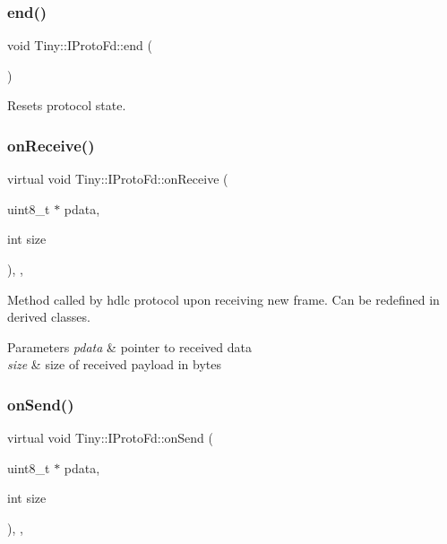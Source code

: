 \subsubsection{\texorpdfstring{end()}{end()}}
{\footnotesize\ttfamily void Tiny\+::\+I\+Proto\+Fd\+::end (\begin{DoxyParamCaption}{ }\end{DoxyParamCaption})}

Resets protocol state. \mbox{\label{classTiny_1_1IProtoFd_a795b41c969708964cd4646580af1c3ab}} 
\subsubsection{\texorpdfstring{on\+Receive()}{onReceive()}}
{\footnotesize\ttfamily virtual void Tiny\+::\+I\+Proto\+Fd\+::on\+Receive (\begin{DoxyParamCaption}\item[{uint8\+\_\+t $\ast$}]{pdata,  }\item[{int}]{size }\end{DoxyParamCaption})\hspace{0.3cm}{\ttfamily [inline]}, {\ttfamily [protected]}, {\ttfamily [virtual]}}

Method called by hdlc protocol upon receiving new frame. Can be redefined in derived classes. 
\begin{DoxyParams}{Parameters}
{\em pdata} & pointer to received data \\
\hline
{\em size} & size of received payload in bytes \\
\hline
\end{DoxyParams}
\mbox{\label{classTiny_1_1IProtoFd_acd324920c1f35d378fb5153b51cd6561}} 
\subsubsection{\texorpdfstring{on\+Send()}{onSend()}}
{\footnotesize\ttfamily virtual void Tiny\+::\+I\+Proto\+Fd\+::on\+Send (\begin{DoxyParamCaption}\item[{uint8\+\_\+t $\ast$}]{pdata,  }\item[{int}]{size }\end{DoxyParamCaption})\hspace{0.3cm}{\ttfamily [inline]}, {\ttfamily [protected]}, {\ttfamily [virtual]}}


